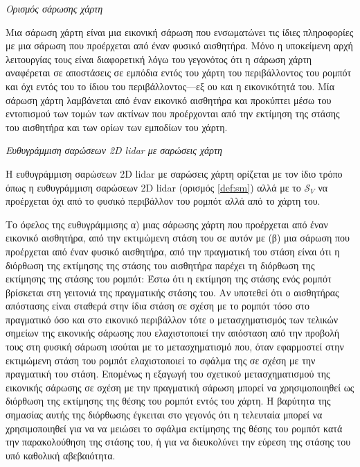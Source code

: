 \begin{bw_box}
\begin{definition}
\label{def:map_scan}
\textit{Ορισμός σάρωσης χάρτη}

Μια σάρωση χάρτη είναι μια εικονική σάρωση που ενσωματώνει τις ίδιες
πληροφορίες με μια σάρωση που προέρχεται από έναν φυσικό αισθητήρα. Μόνο η
υποκείμενη αρχή λειτουργίας τους είναι διαφορετική λόγω του γεγονότος ότι η
σάρωση χάρτη αναφέρεται σε αποστάσεις σε εμπόδια εντός του χάρτη του
περιβάλλοντος του ρομπότ και όχι εντός του το ίδιου του περιβάλλοντος---εξ ου
και η εικονικότητά του. Μία σάρωση χάρτη λαμβάνεται από έναν εικονικό
αισθητήρα και προκύπτει μέσω του εντοπισμού των τομών των ακτίνων που
προέρχονται από την εκτίμηση της στάσης του αισθητήρα και των ορίων των
εμποδίων του χάρτη.
\end{definition}
\end{bw_box}

\begin{bw_box}
\begin{definition}
\label{def:smsm}
\textit{Ευθυγράμμιση σαρώσεων 2D lidar με σαρώσεις χάρτη}

Η ευθυγράμμιση σαρώσεων 2D lidar με σαρώσεις χάρτη ορίζεται με τον ίδιο τρόπο
όπως η ευθυγράμμιση σαρώσεων 2D lidar (ορισμός \ref{def:sm}) αλλά με το
$\mathcal{S}_V$ να προέρχεται όχι από το φυσικό περιβάλλον του ρομπότ αλλά
από το χάρτη του.
\end{definition}
\end{bw_box}


\begin{gg_box}
\begin{remark}
Το όφελος της ευθυγράμμισης α) μιας σάρωσης χάρτη που προέρχεται από έναν
εικονικό αισθητήρα, από την εκτιμώμενη στάση του σε αυτόν με (β) μια σάρωση
που προέρχεται από έναν φυσικό αισθητήρα, από την πραγματική του στάση είναι
ότι η διόρθωση της εκτίμησης της στάσης του αισθητήρα παρέχει τη διόρθωση της
εκτίμησης της στάσης του ρομπότ: Έστω ότι η εκτίμηση της στάσης ενός ρομπότ
βρίσκεται στη γειτονιά της πραγματικής στάσης του. Αν υποτεθεί ότι ο
αισθητήρας απόστασης είναι σταθερά στην ίδια στάση σε σχέση με το ρομπότ τόσο
στο πραγματικό όσο και στο εικονικό περιβάλλον τότε ο μετασχηματισμός των
τελικών σημείων της εικονικής σάρωσης που ελαχιστοποιεί την απόσταση από την
προβολή τους στη φυσική σάρωση ισούται με το μετασχηματισμό που, όταν
εφαρμοστεί στην εκτιμώμενη στάση του ρομπότ ελαχιστοποιεί το σφάλμα της σε
σχέση με την πραγματική του στάση. Επομένως η εξαγωγή του σχετικού
μετασχηματισμού της εικονικής σάρωσης σε σχέση με την πραγματική σάρωση
μπορεί να χρησιμοποιηθεί ως διόρθωση της εκτίμησης της θέσης του ρομπότ εντός
του χάρτη. Η βαρύτητα της σημασίας αυτής της διόρθωσης έγκειται στο γεγονός
ότι η τελευταία μπορεί να χρησιμοποιηθεί για να να μειώσει το σφάλμα
εκτίμησης της θέσης του ρομπότ κατά την παρακολούθηση της στάσης του, ή για
να διευκολύνει την εύρεση της στάσης του υπό καθολική αβεβαιότητα.
\end{remark}
\end{gg_box}


